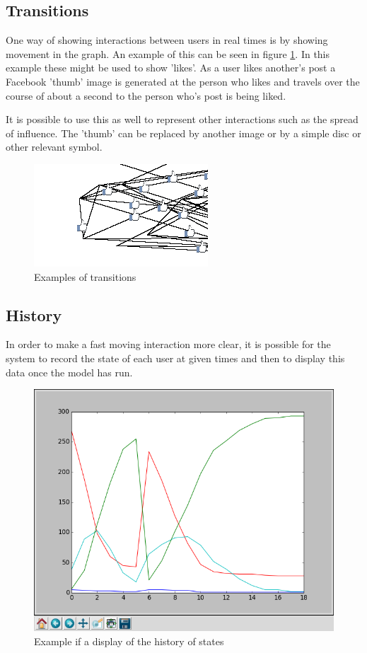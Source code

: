 \documentclass[12pt,a4paper]{article}
\begin{document}
\subsection{Transitions}

One way of showing interactions between users in real times is by showing movement in the graph. An example of this can be seen in figure \ref{fig:transitions}. In this example these might be used to show 'likes'. As a user likes another's post a Facebook 'thumb' image is generated at the person who likes and travels over the course of about a second to the person who's post is being liked.

It is possible to use this as well to represent other interactions such as the spread of influence. The 'thumb' can be replaced by another image or by a simple disc or other relevant symbol.

\begin{figure}[htb]
\caption{Examples of transitions}
\label{fig:transitions}
\centering
\includegraphics[scale=1]{Transitions.png}
\end{figure}

\subsection{History}

In order to make a fast moving interaction more clear, it is possible for the system to record the state of each user at given times and then to display this data once the model has run.

\begin{figure}[htb]
\caption{Example if a display of the history of states}
\label{fig:history}
\centering
\includegraphics[scale=0.3]{Graph.png}
\end{figure}
\end{document}
